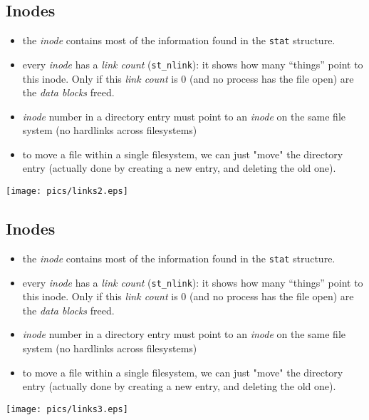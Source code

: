 \documentclass[xga]{xdvislides}
\begin{document}
\subsection{Inodes}
\begin{itemize}
	\item the {\em inode} contains most of the information found in the {\tt stat}
		structure.
	\item every {\em inode} has a {\em link count} ({\tt st\_nlink}):  it
		shows how many ``things'' point to this inode.  Only if this
		{\em link count} is 0 (and no process has the file open) are the
		{\em data blocks} freed.
	\item {\em inode} number in a directory entry must point to an {\em inode}
		on the same file system (no hardlinks across filesystems)
	\item to move a file within a single filesystem, we can just "move" the
		directory entry (actually done by creating a new entry, and deleting
		the old one).
\end{itemize}
\texttt{[image: pics/links2.eps]}

\subsection{Inodes}
\begin{itemize}
	\item the {\em inode} contains most of the information found in the {\tt stat}
		structure.
	\item every {\em inode} has a {\em link count} ({\tt st\_nlink}):  it
		shows how many ``things'' point to this inode.  Only if this
		{\em link count} is 0 (and no process has the file open) are the
		{\em data blocks} freed.
	\item {\em inode} number in a directory entry must point to an {\em inode}
		on the same file system (no hardlinks across filesystems)
	\item to move a file within a single filesystem, we can just "move" the
		directory entry (actually done by creating a new entry, and deleting
		the old one).
\end{itemize}
\texttt{[image: pics/links3.eps]}
\end{document}
